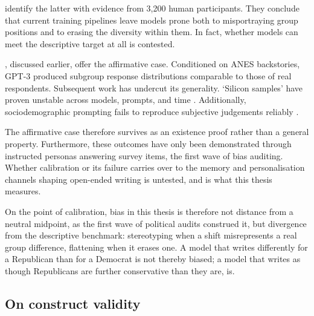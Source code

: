 \citet{wang_large_2025} identify the latter with evidence from 3,200 human participants. They conclude that current training pipelines leave models prone both to misportraying group positions and to erasing the diversity within them. In fact, whether models can meet the descriptive target at all is contested. 

\citet{argyle_out_2023}, discussed earlier, offer the affirmative case. Conditioned on ANES backstories, GPT-3 produced subgroup response distributions comparable to those of real respondents. Subsequent work has undercut its generality. `Silicon samples' have proven unstable across models, prompts, and time \citep{boelaert_machine_2025,bisbee_synthetic_2024}. Additionally, sociodemographic prompting fails to reproduce subjective judgements reliably \citep{sun_sociodemographic_2025}. 

The affirmative case therefore survives as an existence proof rather than a general property. Furthermore, these outcomes have only been demonstrated through instructed personas answering survey items, the first wave of bias auditing. Whether calibration or its failure carries over to the memory and personalisation channels shaping open-ended writing is untested, and is what this thesis measures.

On the point of calibration, bias in this thesis is therefore not distance from a neutral midpoint, as the first wave of political audits construed it, but divergence from the descriptive benchmark: stereotyping when a shift misrepresents a real group difference, flattening when it erases one. A model that writes differently for a Republican than for a Democrat is not thereby biased; a model that writes as though Republicans are further conservative than they are, is.


\subsection{On construct validity}


